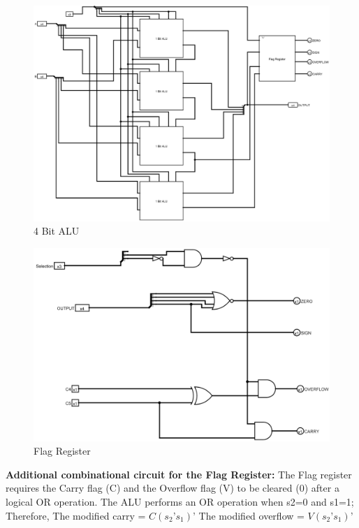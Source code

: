 \documentclass[a4paper]{article}
\begin{document}
\begin{figure}[!htbp]
    \includegraphics[width=\textwidth]{3. 4 bit alu.png}
    \caption{4 Bit ALU}
\end{figure}

\newpage

\begin{figure}[h]
    \includegraphics[width=\textwidth]{4. flag register.png}
    \caption{Flag Register}
\end{figure}

\textbf{Additional combinational circuit for the Flag Register:}
\newline
The Flag register requires the Carry flag (C) and the Overflow flag (V) to be cleared (0) after a logical OR operation. The ALU performs an OR operation when s2=0 and s1=1; Therefore,
\newline
The modified carry = $C(s_2’s_1)’$
\newline
The modified overflow = $V(s_2’s_1)’$
\end{document}
